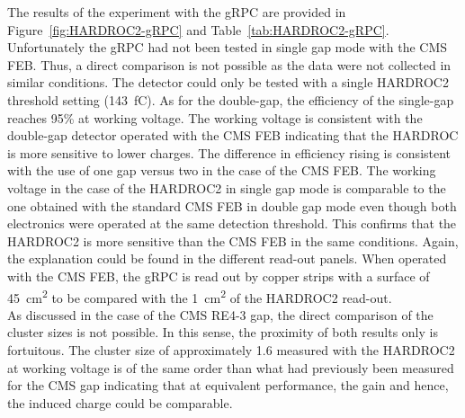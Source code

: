 	The results of the experiment with the gRPC are provided in Figure~\ref{fig:HARDROC2-gRPC} and Table~\ref{tab:HARDROC2-gRPC}. Unfortunately the gRPC had not been tested in single gap mode with the CMS FEB. Thus, a direct comparison is not possible as the data were not collected in similar conditions. The detector could only be tested with a single HARDROC2 threshold setting (\SI{143}{fC}). As for the double-gap, the efficiency of the single-gap reaches 95\% at working voltage. The working voltage is consistent with the double-gap detector operated with the CMS FEB indicating that the HARDROC is more sensitive to lower charges. The difference in efficiency rising is consistent with the use of one gap versus two in the case of the CMS FEB. The working voltage in the case of the HARDROC2 in single gap mode is comparable to the one obtained with the standard CMS FEB in double gap mode even though both electronics were operated at the same detection threshold. This confirms that the HARDROC2 is more sensitive than the CMS FEB in the same conditions. Again, the explanation could be found in the different read-out panels. When operated with the CMS FEB, the gRPC is read out by copper strips with a surface of \SI{45}{cm^2} to be compared with the \SI{1}{cm^2} of the HARDROC2 read-out.\\
	As discussed in the case of the CMS RE4-3 gap, the direct comparison of the cluster sizes is not possible. In this sense, the proximity of both results only is fortuitous. The cluster size of approximately 1.6 measured with the HARDROC2 at working voltage is of the same order than what had previously been measured for the CMS gap indicating that at equivalent performance, the gain and hence, the induced charge could be comparable.
	
